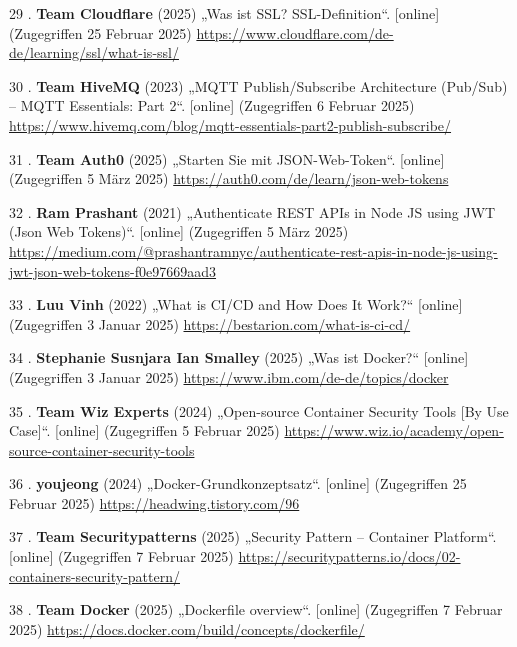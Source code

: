 \documentclass[
    headings=optiontotocandhead,%
    twoside,
    numbers=noenddot,%
    12pt, %
    titlepage, %
    parskip=full, %
    listof=leveldown, 
    numbers=noenddot, %
    a4paper,DIV=14,
    BCOR=15mm,
]{scrbook}
\newlength{\cslhangindent}
\newenvironment{cslreferences}%
  {\setlength{\parindent}{0pt}%
  \everypar{\setlength{\hangindent}{\cslhangindent}}\ignorespaces}%
  {\par}
\begin{document}
\begin{cslreferences}
\leavevmode\hypertarget{ref-ssl}{}%
29 . \textbf{Team Cloudflare} (2025) „Was ist SSL? \textbar{}
SSL-Definition``. {[}online{]} (Zugegriffen 25 Februar 2025)
\url{https://www.cloudflare.com/de-de/learning/ssl/what-is-ssl/}

\leavevmode\hypertarget{ref-mqtt-hivemq}{}%
30 . \textbf{Team HiveMQ} (2023) „MQTT Publish/Subscribe Architecture
(Pub/Sub) -- MQTT Essentials: Part 2``. {[}online{]} (Zugegriffen 6
Februar 2025)
\url{https://www.hivemq.com/blog/mqtt-essentials-part2-publish-subscribe/}

\leavevmode\hypertarget{ref-jwt}{}%
31 . \textbf{Team Auth0} (2025) „Starten Sie mit JSON-Web-Token``.
{[}online{]} (Zugegriffen 5 März 2025)
\url{https://auth0.com/de/learn/json-web-tokens}

\leavevmode\hypertarget{ref-medium-auth-simple}{}%
32 . \textbf{Ram Prashant} (2021) „Authenticate REST APIs in Node JS
using JWT (Json Web Tokens)``. {[}online{]} (Zugegriffen 5 März 2025)
\url{https://medium.com/@prashantramnyc/authenticate-rest-apis-in-node-js-using-jwt-json-web-tokens-f0e97669aad3}

\leavevmode\hypertarget{ref-bestarion}{}%
33 . \textbf{Luu Vinh} (2022) „What is CI/CD and How Does It Work?{}``
{[}online{]} (Zugegriffen 3 Januar 2025)
\url{https://bestarion.com/what-is-ci-cd/}

\leavevmode\hypertarget{ref-ibm-docker}{}%
34 . \textbf{Stephanie Susnjara Ian Smalley} (2025) „Was ist Docker?{}``
{[}online{]} (Zugegriffen 3 Januar 2025)
\url{https://www.ibm.com/de-de/topics/docker}

\leavevmode\hypertarget{ref-docker-security}{}%
35 . \textbf{Team Wiz Experts} (2024) „Open-source Container Security
Tools {[}By Use Case{]}``. {[}online{]} (Zugegriffen 5 Februar 2025)
\url{https://www.wiz.io/academy/open-source-container-security-tools}

\leavevmode\hypertarget{ref-docker-image-layers}{}%
36 . \textbf{youjeong} (2024) „Docker-Grundkonzeptsatz``. {[}online{]}
(Zugegriffen 25 Februar 2025) \url{https://headwing.tistory.com/96}

\leavevmode\hypertarget{ref-container-overview}{}%
37 . \textbf{Team Securitypatterns} (2025) „Security Pattern --
Container Platform``. {[}online{]} (Zugegriffen 7 Februar 2025)
\url{https://securitypatterns.io/docs/02-containers-security-pattern/}

\leavevmode\hypertarget{ref-docker-dockerfile}{}%
38 . \textbf{Team Docker} (2025) „Dockerfile overview``. {[}online{]}
(Zugegriffen 7 Februar 2025)
\url{https://docs.docker.com/build/concepts/dockerfile/}


\end{cslreferences}
\end{document}
